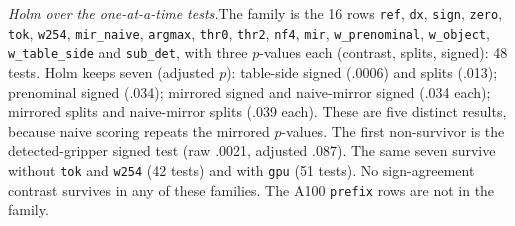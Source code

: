 \documentclass[conference]{IEEEtran}
\newcommand{\rowid}[1]{\texttt{#1}}
\newcommand{\head}[1]{\textit{#1}\hspace{0.4em}}
\begin{document}
\head{Holm over the one-at-a-time tests.}The family is the 16 rows \rowid{ref}, \rowid{dx}, \rowid{sign}, \rowid{zero}, \rowid{tok}, \rowid{w254}, \rowid{mir\_naive}, \rowid{argmax}, \rowid{thr0}, \rowid{thr2}, \rowid{nf4}, \rowid{mir}, \rowid{w\_prenominal}, \rowid{w\_object}, \rowid{w\_table\_side} and \rowid{sub\_det}, with three $p$-values each (contrast, splits, signed): 48 tests. Holm keeps seven (adjusted $p$): table-side signed (.0006) and splits (.013); prenominal signed (.034); mirrored signed and naive-mirror signed (.034 each); mirrored splits and naive-mirror splits (.039 each). These are five distinct results, because naive scoring repeats the mirrored $p$-values. The first non-survivor is the detected-gripper signed test (raw .0021, adjusted .087). The same seven survive without \rowid{tok} and \rowid{w254} (42 tests) and with \rowid{gpu} (51 tests). No sign-agreement contrast survives in any of these families. The A100 \rowid{prefix} rows are not in the family.
\end{document}
